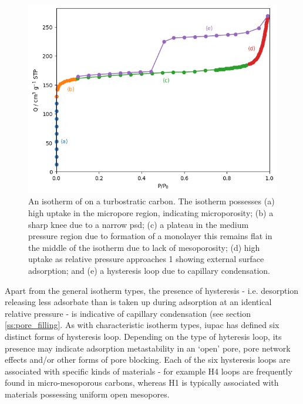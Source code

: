 \begin{figure}[t!]
    \centering
    \includegraphics[width=\columnwidth, keepaspectratio]{1-introduction/figs/isotherm_anatomy.png}
    \caption{An isotherm of  on a turbostratic carbon. The isotherm possesses (a) high uptake in the micropore region, indicating microporosity; (b) a sharp knee due to a narrow \acrshort{psd}; (c) a plateau in the medium pressure region due to formation of a monolayer this remains flat in the middle of the isotherm due to lack of mesoporosity; (d) high uptake as relative pressure approaches 1 showing external surface adsorption; and (e) a hysteresis loop due to capillary condensation.}
    \label{fig:isotherm_anatomy}
\end{figure}

Apart from the general isotherm types, the presence of hysteresis - i.e. desorption releasing less \gls{adsorbate} than is taken up during adsorption at an identical relative pressure - is indicative of capillary condensation (see section \ref{ss:pore_filling}.\citep{thommes2014physical, monson2012understanding, landers2013density} As with characteristic isotherm types, \acrshort{iupac} has defined six distinct forms of hysteresis loop. Depending on the type of hyteresis loop, its presence may indicate adsorption metastability in an `open' pore, pore network effects and/or other forms of pore blocking.\citep{Thommes2015Physisorption} Each of the six hysteresis loops are associated with specific kinds of materials - for example H4 loops are frequently found in micro-mesoporous carbons, whereas H1 is typically associated with materials possessing uniform open mesopores.\citep{Thommes2015Physisorption, monson2012understanding}  

